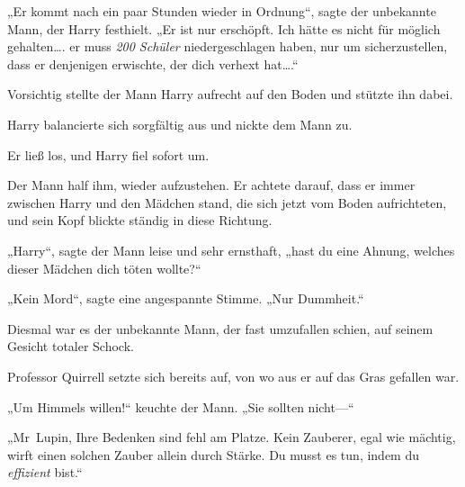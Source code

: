 „Er kommt nach ein paar Stunden wieder in Ordnung“, sagte der unbekannte Mann, der Harry festhielt. „Er ist nur erschöpft. Ich hätte es nicht für möglich gehalten…. er muss \emph{200 Schüler} niedergeschlagen haben, nur um sicherzustellen, dass er denjenigen erwischte, der dich verhext hat….“

Vorsichtig stellte der Mann Harry aufrecht auf den Boden und stützte ihn dabei.

Harry balancierte sich sorgfältig aus und nickte dem Mann zu.

Er ließ los, und Harry fiel sofort um.

Der Mann half ihm, wieder aufzustehen. Er achtete darauf, dass er immer zwischen Harry und den Mädchen stand, die sich jetzt vom Boden aufrichteten, und sein Kopf blickte ständig in diese Richtung.

„Harry“, sagte der Mann leise und sehr ernsthaft, „hast du eine Ahnung, welches dieser Mädchen dich töten wollte?“

„Kein Mord“, sagte eine angespannte Stimme. „Nur Dummheit.“

Diesmal war es der unbekannte Mann, der fast umzufallen schien, auf seinem Gesicht totaler Schock.

Professor Quirrell setzte sich bereits auf, von wo aus er auf das Gras gefallen war.

„Um Himmels willen!“ keuchte der Mann. „Sie sollten nicht—“

„Mr~Lupin, Ihre Bedenken sind fehl am Platze. Kein Zauberer, egal wie mächtig, wirft einen solchen Zauber allein durch Stärke. Du musst es tun, indem du \emph{effizient} bist.“

